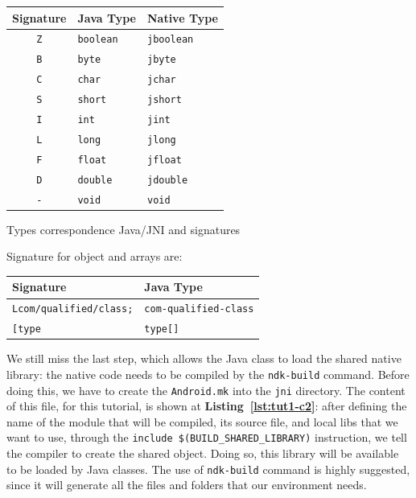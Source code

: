 \documentclass[a4paper,10pt]{article}
\makeatletter
\newenvironment{tablehere}{\def\@captype{table}}{}
\newcommand{\keyword}[1]{\texttt{#1}}
\newcommand{\refl}[1]{\textbf{Listing~\ref{#1}}}
\makeatother
\begin{document}
\begin{multicols}{2}
\begin{itemize}
\end{itemize}
\vspace{1em}
\begin{tablehere}
	\centering	
	\begin{tabular}{c l p{2cm}}
		\hline
		Signature & Java Type & Native Type \\
		\hline
		\texttt{Z} & \texttt{boolean} & \texttt{jboolean} \\
		\texttt{B} & \texttt{byte} & \texttt{jbyte} \\
		\texttt{C} & \texttt{char} & \texttt{jchar} \\
		\texttt{S} & \texttt{short} & \texttt{jshort} \\
		\texttt{I} & \texttt{int} & \texttt{jint} \\
		\texttt{L} & \texttt{long} & \texttt{jlong} \\
		\texttt{F} & \texttt{float} & \texttt{jfloat} \\
		\texttt{D} & \texttt{double} & \texttt{jdouble} \\
		\texttt{-} & \texttt{void} & \texttt{void} \\
		\hline
	\end{tabular}
	\caption{Types correspondence Java/JNI and signatures}
	\label{table:types-correspondence}
\end{tablehere}
\vspace{1em}
Signature for object and arrays are:\\
\vspace{1em}
\begin{tablehere}
	\centering
	\begin{tabular}{l l}
		\hline
		Signature & Java Type\\
		\hline
		\texttt{Lcom/qualified/class;} & \texttt{com-qualified-class}\\
		\texttt{[type} & \texttt{type[]}\\
		\hline
	\end{tabular}
\end{tablehere}

We still miss the last step, which allows the Java class to load the shared native library: the native code needs to be compiled by the \keyword{ndk-build} command. Before doing this, we have to create the \keyword{Android.mk} into the \keyword{jni} directory. The content of this file, for this tutorial, is shown at \refl{lst:tut1-c2}: after defining the name of the module that will be compiled, its source file, and local libs that we want to use, through the \keyword{include \$(BUILD\_SHARED\_LIBRARY)} instruction, we tell the compiler to create the shared object. Doing so, this library will be available to be loaded by Java classes. The use of \keyword{ndk-build} command is highly suggested, since it will generate all the files and folders that our environment needs.


\end{multicols}
\end{document}
